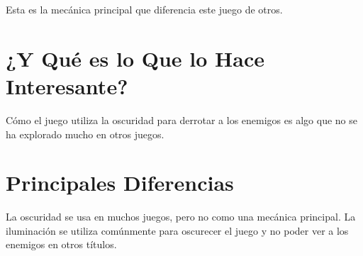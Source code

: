 \begin{multicols}{2}
    Esta es la mecánica principal que diferencia este juego de otros.

    \section{¿Y Qué es lo Que lo Hace Interesante?}
    Cómo el juego utiliza la oscuridad para derrotar a los enemigos es algo que no se ha explorado mucho en otros juegos.

    \section{Principales Diferencias}
    La oscuridad se usa en muchos juegos, pero no como una mecánica principal. La iluminación se utiliza comúnmente para oscurecer el juego y no poder ver a los enemigos en otros títulos.

    \end{multicols}
